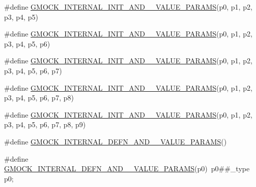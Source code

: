 \begin{DoxyCompactItemize}
\item 
\#define \mbox{\hyperlink{_obj__test_2lib_2googletest-release-1_88_81_2googlemock_2include_2gmock_2gmock-generated-actions_8h_aef68add35463c75130872b22d07c43ff}{G\+M\+O\+C\+K\+\_\+\+I\+N\+T\+E\+R\+N\+A\+L\+\_\+\+I\+N\+I\+T\+\_\+\+A\+N\+D\+\_\+\_\+\+V\+A\+L\+U\+E\+\_\+\+P\+A\+R\+A\+MS}}(p0,  p1,  p2,  p3,  p4,  p5)
\item 
\#define \mbox{\hyperlink{_obj__test_2lib_2googletest-release-1_88_81_2googlemock_2include_2gmock_2gmock-generated-actions_8h_aa1ba027eec9b36d5e710bfe9da99d443}{G\+M\+O\+C\+K\+\_\+\+I\+N\+T\+E\+R\+N\+A\+L\+\_\+\+I\+N\+I\+T\+\_\+\+A\+N\+D\+\_\+\_\+\+V\+A\+L\+U\+E\+\_\+\+P\+A\+R\+A\+MS}}(p0,  p1,  p2,  p3,  p4,  p5,  p6)
\item 
\#define \mbox{\hyperlink{_obj__test_2lib_2googletest-release-1_88_81_2googlemock_2include_2gmock_2gmock-generated-actions_8h_a12a0e970438c008214093b98b8eefa68}{G\+M\+O\+C\+K\+\_\+\+I\+N\+T\+E\+R\+N\+A\+L\+\_\+\+I\+N\+I\+T\+\_\+\+A\+N\+D\+\_\+\_\+\+V\+A\+L\+U\+E\+\_\+\+P\+A\+R\+A\+MS}}(p0,  p1,  p2,  p3,  p4,  p5,  p6,  p7)
\item 
\#define \mbox{\hyperlink{_obj__test_2lib_2googletest-release-1_88_81_2googlemock_2include_2gmock_2gmock-generated-actions_8h_aa69890581b384540649239847bd7dcbf}{G\+M\+O\+C\+K\+\_\+\+I\+N\+T\+E\+R\+N\+A\+L\+\_\+\+I\+N\+I\+T\+\_\+\+A\+N\+D\+\_\+\_\+\+V\+A\+L\+U\+E\+\_\+\+P\+A\+R\+A\+MS}}(p0,  p1,  p2,  p3,  p4,  p5,  p6,  p7,  p8)
\item 
\#define \mbox{\hyperlink{_obj__test_2lib_2googletest-release-1_88_81_2googlemock_2include_2gmock_2gmock-generated-actions_8h_aeed917d405a99878e11d53b8eca2b744}{G\+M\+O\+C\+K\+\_\+\+I\+N\+T\+E\+R\+N\+A\+L\+\_\+\+I\+N\+I\+T\+\_\+\+A\+N\+D\+\_\+\_\+\+V\+A\+L\+U\+E\+\_\+\+P\+A\+R\+A\+MS}}(p0,  p1,  p2,  p3,  p4,  p5,  p6,  p7,  p8,  p9)
\item 
\#define \mbox{\hyperlink{_obj__test_2lib_2googletest-release-1_88_81_2googlemock_2include_2gmock_2gmock-generated-actions_8h_a3fef729577c726683358d924c3d31c18}{G\+M\+O\+C\+K\+\_\+\+I\+N\+T\+E\+R\+N\+A\+L\+\_\+\+D\+E\+F\+N\+\_\+\+A\+N\+D\+\_\+\_\+\+V\+A\+L\+U\+E\+\_\+\+P\+A\+R\+A\+MS}}()
\item 
\#define \mbox{\hyperlink{_obj__test_2lib_2googletest-release-1_88_81_2googlemock_2include_2gmock_2gmock-generated-actions_8h_a9a2a07e6eff8e4ca6d45b8f7ea11cf3b}{G\+M\+O\+C\+K\+\_\+\+I\+N\+T\+E\+R\+N\+A\+L\+\_\+\+D\+E\+F\+N\+\_\+\+A\+N\+D\+\_\+\_\+\+V\+A\+L\+U\+E\+\_\+\+P\+A\+R\+A\+MS}}(p0)~p0\#\#\+\_\+type p0;
\item 

\end{DoxyCompactItemize}
